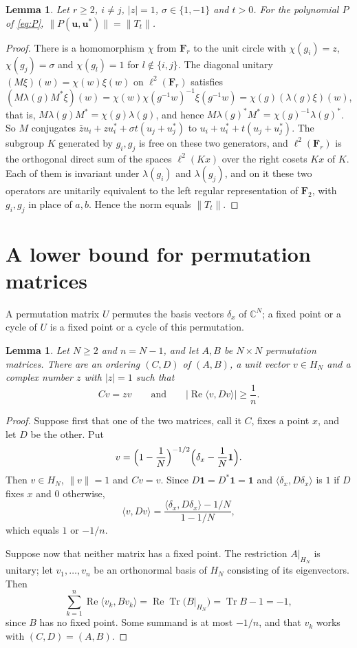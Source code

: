 \documentclass[11pt]{article}
\newtheorem{lemma}[theorem]{Lemma}
\theoremstyle{remark}
\newcommand{\one}{\mathbf 1}
\begin{document}
\begin{lemma}\label{lem:phase}
Let $r\ge 2$, $i\ne j$, $|z|=1$, $\sigma\in\{1,-1\}$ and $t>0$. For the polynomial $P$ of \eqref{eq:P},
$\|P(\mathbf u,\mathbf u^*)\|=\|T_t\|$.
\end{lemma}

\begin{proof}
There is a homomorphism $\chi$ from $\mathbf F_r$ to the unit circle with $\chi(g_i)=z$, $\chi(g_j)=\sigma$ and
$\chi(g_l)=1$ for $l\notin\{i,j\}$. The diagonal unitary $(M\xi)(w)=\chi(w)\xi(w)$ on $\ell^2(\mathbf F_r)$ satisfies
$(M\lambda(g)M^*\xi)(w)=\chi(w)\chi(g^{-1}w)^{-1}\xi(g^{-1}w)=\chi(g)(\lambda(g)\xi)(w)$, that is,
$M\lambda(g)M^*=\chi(g)\lambda(g)$, and hence $M\lambda(g)^*M^*=\chi(g)^{-1}\lambda(g)^*$. So $M$ conjugates $\bar z u_i+zu_i^*+\sigma t(u_j+u_j^*)$ to $u_i+u_i^*+t(u_j+u_j^*)$. The subgroup
$K$ generated by $g_i,g_j$ is free on these two generators, and $\ell^2(\mathbf F_r)$ is the orthogonal direct sum of
the spaces $\ell^2(Kx)$ over the right cosets $Kx$ of $K$. Each of them is invariant under $\lambda(g_i)$ and
$\lambda(g_j)$, and on it these two operators are unitarily equivalent to the left regular representation of
$\mathbf F_2$, with $g_i,g_j$ in place of $a,b$. Hence the norm equals $\|T_t\|$.
\end{proof}

\section{A lower bound for permutation matrices}\label{sec:finite}

A permutation matrix $U$ permutes the basis vectors $\delta_x$ of $\mathbb C^N$; a fixed point or a cycle of $U$
is a fixed point or a cycle of this permutation.

\begin{lemma}\label{lem:finite}
Let $N\ge 2$ and $n=N-1$, and let $A,B$ be $N\times N$ permutation matrices. There are an ordering $(C,D)$ of $(A,B)$, a
unit vector $v\in H_N$ and a complex number $z$ with $|z|=1$ such that
\[
  Cv=zv\qquad\text{and}\qquad|\operatorname{Re}\langle v,Dv\rangle|\ge\frac1n .
\]
\end{lemma}

\begin{proof}
Suppose first that one of the two matrices, call it $C$, fixes a point $x$, and let $D$ be the other. Put
\[
  v=\Bigl(1-\frac1N\Bigr)^{-1/2}\Bigl(\delta_x-\frac1N\one\Bigr).
\]
Then $v\in H_N$, $\|v\|=1$ and $Cv=v$. Since $D\one=D^*\one=\one$ and $\langle\delta_x,D\delta_x\rangle$ is $1$ if
$D$ fixes $x$ and $0$ otherwise,
\[
  \langle v,Dv\rangle=\frac{\langle\delta_x,D\delta_x\rangle-1/N}{1-1/N},
\]
which equals $1$ or $-1/n$.

Suppose now that neither matrix has a fixed point. The restriction $A|_{H_N}$ is unitary; let
$v_1,\dots,v_n$ be an orthonormal basis of $H_N$ consisting of its eigenvectors. Then
\[
  \sum_{k=1}^n\operatorname{Re}\langle v_k,Bv_k\rangle=\operatorname{Re}\operatorname{Tr}\bigl(B|_{H_N}\bigr)
  =\operatorname{Tr}B-1=-1,
\]
since $B$ has no fixed point. Some summand is at most $-1/n$, and that $v_k$ works with $(C,D)=(A,B)$.
\end{proof}
\end{document}
